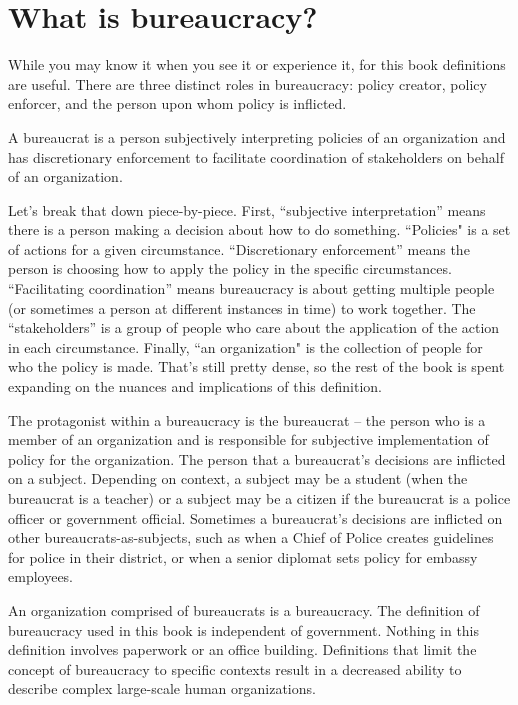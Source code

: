 \section{What is bureaucracy?\label{sec:define_bureaucracy}}


While you may know it when you see it or experience it, for this book definitions are useful. There are three distinct roles in bureaucracy: policy creator, policy enforcer, and the person upon whom policy is inflicted.

A \gls{bureaucrat} is a person subjectively interpreting policies of an organization and has discretionary enforcement to facilitate coordination of stakeholders on behalf of an organization. 

Let's break that down piece-by-piece. First, ``subjective interpretation'' means there is a person making a decision about how to do something. ``Policies" is a set of actions for a given circumstance. ``Discretionary enforcement'' means the person is choosing how to apply the policy in the specific circumstances. ``Facilitating coordination'' means bureaucracy is about getting multiple people (or sometimes a person at different instances in time) to work together. The ``stakeholders'' is a group of people who care about the application of the action in each circumstance. Finally, ``an \gls{organization}" is the collection of people for who the policy is made. That's still pretty dense, so the rest of the book is spent expanding on the nuances and implications of this definition.

The protagonist within a \gls{bureaucracy} is the \gls{bureaucrat} -- the person who is a member of an organization and is responsible for subjective implementation of policy for the organization. The person that a bureaucrat's decisions are inflicted on a \gls{subject}.  Depending on context, a subject may be a student (when the bureaucrat is a teacher) or a subject may be a citizen if the bureaucrat is a police officer or government official. Sometimes a bureaucrat's decisions are inflicted on other bureaucrats-as-subjects, such as when a Chief of Police creates guidelines for police in their district, or when a senior diplomat sets policy for embassy employees. 



An organization comprised of bureaucrats is a \gls{bureaucracy}. The definition of bureaucracy used in this book is independent of government. Nothing in this definition involves paperwork or an office building. Definitions that limit the concept of bureaucracy to specific contexts result in a  decreased ability to describe complex large-scale human organizations. 

